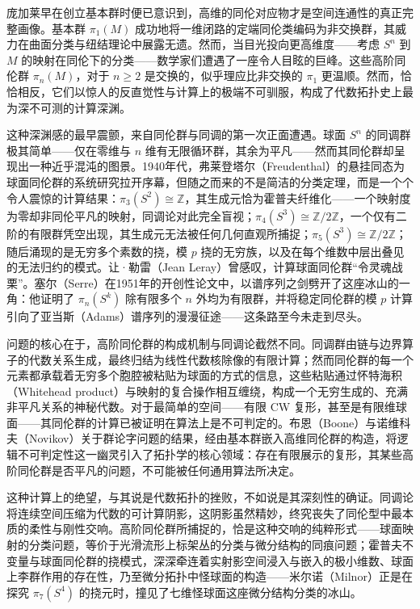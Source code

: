 \documentclass[12pt,a4paper]{article}
\begin{document}
庞加莱早在创立基本群时便已意识到，高维的同伦对应物才是空间连通性的真正完整画像。基本群 $\pi_1(M)$ 成功地将一维闭路的定端同伦类编码为非交换群，其威力在曲面分类与纽结理论中展露无遗。然而，当目光投向更高维度——考虑 $S^n$ 到 $M$ 的映射在同伦下的分类——数学家们遭遇了一座令人目眩的巨峰。这些高阶同伦群 $\pi_n(M)$，对于 $n \geq 2$ 是交换的，似乎理应比非交换的 $\pi_1$ 更温顺。然而，恰恰相反，它们以惊人的反直觉性与计算上的极端不可驯服，构成了代数拓扑史上最为深不可测的计算深渊。

这种深渊感的最早震颤，来自同伦群与同调的第一次正面遭遇。球面 $S^n$ 的同调群极其简单——仅在零维与 $n$ 维有无限循环群，其余为平凡——然而其同伦群却呈现出一种近乎混沌的图景。1940年代，弗莱登塔尔（Freudenthal）的悬挂同态为球面同伦群的系统研究拉开序幕，但随之而来的不是简洁的分类定理，而是一个个令人震惊的计算结果：$\pi_3(S^2) \cong \mathbb{Z}$，其生成元恰为霍普夫纤维化——一个映射度为零却非同伦平凡的映射，同调论对此完全盲视；$\pi_4(S^3) \cong \mathbb{Z}/2\mathbb{Z}$，一个仅有二阶的有限群凭空出现，其生成元无法被任何几何直观所捕捉；$\pi_5(S^3) \cong \mathbb{Z}/2\mathbb{Z}$；随后涌现的是无穷多个素数的挠，模 $p$ 挠的无穷族，以及在每个维数中层出叠见的无法归约的模式。让·勒雷（Jean Leray）曾感叹，计算球面同伦群“令灵魂战栗”。塞尔（Serre）在1951年的开创性论文中，以谱序列之剑劈开了这座冰山的一角：他证明了 $\pi_n(S^k)$ 除有限多个 $n$ 外均为有限群，并将稳定同伦群的模 $p$ 计算引向了亚当斯（Adams）谱序列的漫漫征途——这条路至今未走到尽头。

问题的核心在于，高阶同伦群的构成机制与同调论截然不同。同调群由链与边界算子的代数关系生成，最终归结为线性代数核除像的有限计算；然而同伦群的每一个元素都承载着无穷多个胞腔被粘贴为球面的方式的信息，这些粘贴通过怀特海积（Whitehead product）与映射的复合操作相互缠绕，构成一个无穷生成的、充满非平凡关系的神秘代数。对于最简单的空间——有限 CW 复形，甚至是有限维球面——其同伦群的计算已被证明在算法上是不可判定的。布恩（Boone）与诺维科夫（Novikov）关于群论字问题的结果，经由基本群嵌入高维同伦群的构造，将逻辑不可判定性这一幽灵引入了拓扑学的核心领域：存在有限展示的复形，其某些高阶同伦群是否平凡的问题，不可能被任何通用算法所决定。

这种计算上的绝望，与其说是代数拓扑的挫败，不如说是其深刻性的确证。同调论将连续空间压缩为代数的可计算阴影，这阴影虽然精妙，终究丧失了同伦型中最本质的柔性与刚性交响。高阶同伦群所捕捉的，恰是这种交响的纯粹形式——球面映射的分类问题，等价于光滑流形上标架丛的分类与微分结构的同痕问题；霍普夫不变量与球面同伦群的挠模式，深深牵连着实射影空间浸入与嵌入的极小维数、球面上李群作用的存在性，乃至微分拓扑中怪球面的构造——米尔诺（Milnor）正是在探究 $\pi_7(S^4)$ 的挠元时，撞见了七维怪球面这座微分结构分类的冰山。
\end{document}
